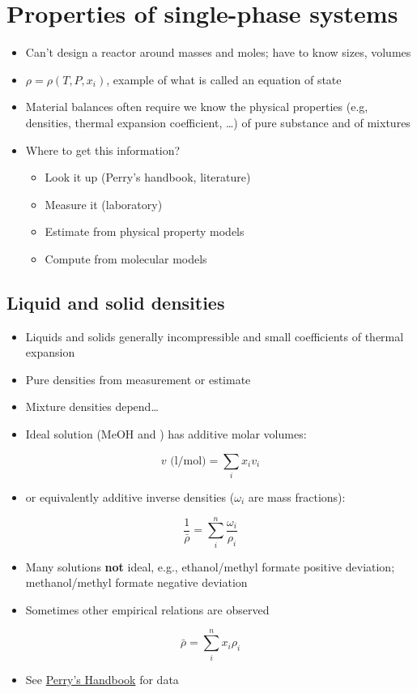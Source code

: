 \documentclass[11pt]{article}
\begin{document}
\section{Properties of single-phase systems}
\label{sec-7}
\begin{itemize}
\item Can't design a reactor around masses and moles; have to know sizes, volumes
\item \(\rho = \rho(T,P,x_{i}) \), example of what is called an equation of state
\item Material balances often require we know the physical properties (e.g, densities, thermal expansion coefficient, \ldots{}) of pure substance and of mixtures
\item Where to get this information?
\begin{itemize}
\item Look it up (Perry's handbook, literature)
\item Measure it (laboratory)
\item Estimate from physical property models
\item Compute from molecular models
\end{itemize}
\end{itemize}

\subsection{Liquid and solid densities}
\label{sec-7-1}
\begin{itemize}
\item Liquids and solids generally incompressible and small coefficients of thermal expansion
\item Pure densities from measurement or estimate
\item Mixture densities depend\ldots{}
\item Ideal solution (MeOH and ) has additive molar volumes:
\end{itemize}
\[ v \text{ (l/mol)} = \sum_{i} x_{i} v_{i} \]
\begin{itemize}
\item or equivalently additive inverse densities (\(\omega_{i}\) are mass fractions):
\end{itemize}
\[ \frac{1}{\bar{\rho}} = \sum_{i}^{n} \frac{\omega_{i}}{\rho_{i}} \]
\begin{itemize}
\item Many solutions \textbf{not} ideal, e.g., ethanol/methyl formate positive deviation; methanol/methyl formate negative deviation
\item Sometimes other empirical relations are observed
\end{itemize}
\[ \bar{\rho} = \sum_{i}^{n} x_{i}\rho_{i}\]
\begin{itemize}
\item See \href{http://library.nd.edu/engineering/}{Perry's Handbook} for data
\end{itemize}
\end{document}
